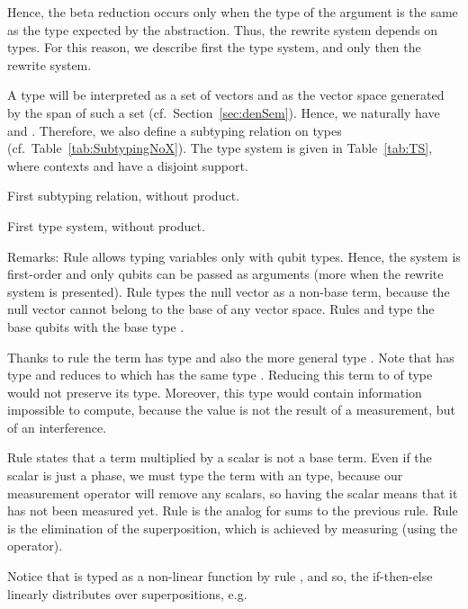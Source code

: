 \documentclass[preprint]{elsarticle}
\begin{document}
Hence, the beta reduction occurs only when the type of the argument is the same
as the type expected by the abstraction. Thus, the rewrite system depends on
types. For this reason, we describe first the type system, and only then the
rewrite system.

A type  will be interpreted as a set of vectors and  as the vector
space generated by the span of such a set (cf.~Section~\ref{sec:denSem}). Hence,
we naturally have  and . Therefore, we also
define a subtyping relation on types (cf.~Table~\ref{tab:SubtypingNoX}). The
type system is given in Table~\ref{tab:TS}, where contexts  and 
have a disjoint support.

\begin{table}
  \centering
  
  
  \caption{First subtyping relation, without product.}
  \label{tab:SubtypingNoX}
\end{table}

\begin{table}
  
  \caption{First type system, without product.}
  \label{tab:TS}
\end{table}

Remarks: Rule  allows typing variables only with qubit types. Hence, the
system is first-order and only qubits can be passed as arguments (more when the
rewrite system is presented). Rule  types the null vector as a
non-base term, because the null vector cannot belong to the base of any vector
space. Rules  and  type the base qubits with the
base type .

Thanks to rule  the term  has type  and also the more
general type . Note that  has type
 and reduces to  which has the same type . Reducing this
term to  of type  would not preserve its type. Moreover, this type
would contain information impossible to compute, because the value  is
not the result of a measurement, but of an interference.

Rule  states that a term multiplied by a scalar is not a base term.
Even if the scalar is just a phase, we must type the term with an 
type, because our measurement operator will remove any scalars, so having the
scalar means that it has not been measured yet. Rule  is the analog for
sums to the previous rule. Rule  is the elimination of the superposition,
which is achieved by measuring (using the  operator).

Notice that  is typed as a non-linear function by rule , and so,
the if-then-else linearly distributes over superpositions, e.g.
\end{document}
